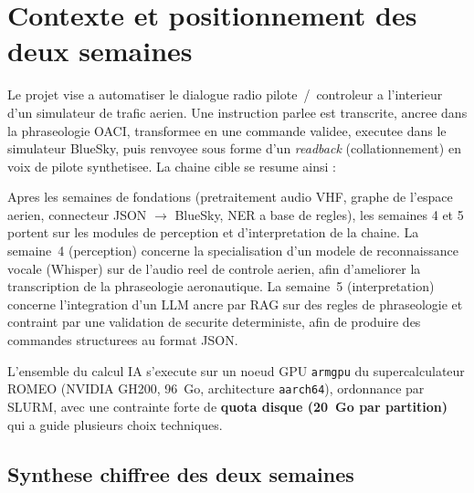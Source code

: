\documentclass[11pt,a4paper]{article}
\begin{document}
\tableofcontents
\thispagestyle{fancy}
\vspace{1cm}

\section{Contexte et positionnement des deux semaines}

Le projet vise a automatiser le dialogue radio pilote~/~controleur a l'interieur
d'un simulateur de trafic aerien. Une instruction parlee est transcrite, ancree
dans la phraseologie OACI, transformee en une commande validee, executee dans le
simulateur BlueSky, puis renvoyee sous forme d'un \emph{readback} (collationnement)
en voix de pilote synthetisee. La chaine cible se resume ainsi :

\begin{center}
\end{center}

Apres les semaines de fondations (pretraitement audio VHF, graphe de l'espace
aerien, connecteur JSON $\rightarrow$ BlueSky, NER a base de regles), les
semaines 4 et 5 portent sur les modules de perception et d'interpretation de la
chaine. La semaine~4 (perception) concerne la specialisation d'un modele de
reconnaissance vocale (Whisper) sur de l'audio reel de controle aerien, afin
d'ameliorer la transcription de la phraseologie aeronautique. La semaine~5
(interpretation) concerne l'integration d'un LLM ancre par RAG sur des regles de
phraseologie et contraint par une validation de securite deterministe, afin de
produire des commandes structurees au format JSON.

L'ensemble du calcul IA s'execute sur un noeud GPU \texttt{armgpu} du
supercalculateur ROMEO (NVIDIA GH200, 96~Go, architecture \texttt{aarch64}),
ordonnance par SLURM, avec une contrainte forte de \textbf{quota disque
(20~Go par partition)} qui a guide plusieurs choix techniques.

\subsection{Synthese chiffree des deux semaines}
\end{document}
